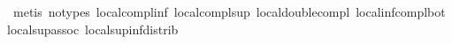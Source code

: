 \begin{isabellebody}
\ {\isacharparenleft}metis\ {\isacharparenleft}no{\isacharunderscore}types{\isacharparenright}\ local{\isachardot}compl{\isacharunderscore}inf\ local{\isachardot}compl{\isacharunderscore}sup\ local{\isachardot}double{\isacharunderscore}compl\ local{\isachardot}inf{\isacharunderscore}compl{\isacharunderscore}bot\ local{\isachardot}sup{\isacharunderscore}assoc\ local{\isachardot}sup{\isacharunderscore}inf{\isacharunderscore}distrib{}{\isacharparenright}\isanewline
{}\isamarkupfalse%
%
\endisatagproof
{\isafoldproof}%
%
\isadelimproof
\isanewline
%
\endisadelimproof
\isanewline
{}\isamarkupfalse%
\isanewline
%
\isadelimtheory
\isanewline
%
\endisadelimtheory
%
\isatagtheory
{}\isamarkupfalse%
%
\endisatagtheory
{\isafoldtheory}%
%
\isadelimtheory
\isanewline
%
\endisadelimtheory
%
\end{isabellebody}%
